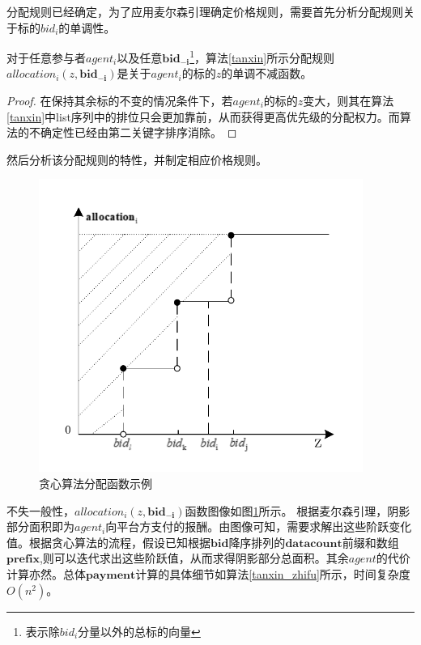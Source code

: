 \documentclass[promaster]{thesis-uestc}
\begin{document}
分配规则已经确定，为了应用麦尔森引理确定价格规则，需要首先分析分配规则关于标的$bid_i$的单调性。

\begin{theorem}
    对于任意参与者$agent_i$以及任意$\mathbf{bid_{-i}}$\footnote{表示除$bid_i$分量以外的总标的向量}，算法\ref{tanxin}所示分配规则$allocation_i(z,\mathbf{bid_{-i}})$是关于$agent_i$的标的$z$的单调不减函数。
\end{theorem}

\begin{proof}
   在保持其余标的不变的情况条件下，若$agent_i$的标的$z$变大，则其在算法\ref{tanxin}中list序列中的排位只会更加靠前，从而获得更高优先级的分配权力。而算法的不确定性已经由第二关键字排序消除。
\end{proof}

然后分析该分配规则的特性，并制定相应价格规则。

\begin{figure}[H]
    \includegraphics[width=300pt]{pic/tanxin_allocation.pdf}
    \caption{贪心算法分配函数示例}
    \label{tanxin_allocation}
\end{figure}

不失一般性，$allocation_i(z,\mathbf{bid_{-i}})$函数图像如图\ref{tanxin_allocation}所示。
根据麦尔森引理，阴影部分面积即为$agent_i$向平台方支付的报酬。由图像可知，需要求解出这些阶跃变化值。根据贪心算法的流程，假设已知根据$\mathbf{bid}$降序排列的$\mathbf{datacount}$前缀和数组$\mathbf{prefix}$,则可以迭代求出这些阶跃值，从而求得阴影部分总面积。其余$agent$的代价计算亦然。总体$\mathbf{payment}$计算的具体细节如算法\ref{tanxin_zhifu}所示，时间复杂度$O(n^2)$。
\end{document}
